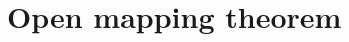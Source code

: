 \newpage
\section{Open mapping theorem}
\begin{comment}
\bsegin{comment}
\begin{definition}[Open map]\label{open map}\nl
	An open map is one for which the image of every open set is open.
\end{definition}
\begin{theorem}[Open Mapping Theorem]\label{OMT}\nl
	Let $X,Y$ be Banach spaces, $T:X\xrightarrow{}Y$ a continuous surjective linear map. Then $T$ is an open map.
\end{theorem}
\eend{comment}

\begin{definition}[Open Ball]\nl
	An open ball in normed linear space $X$ with radius $r>0$ centered at $x\in X$ is
	$$
		B_X(x,r)=\{y\in X:\norm{y-x}_X<r\}
	$$
	Also, when $x=0$ we write
	$$
		B_X(0,r)\equiv B_x(r)
	$$
\end{definition}

\begin{definition}[Open map]\label{open map}\nl
	Let $X$, $Y$ be linear spaces. \func{A}{X}{Y} is {\underline{open}} if $A(U)\subset Y $ is open.
\end{definition}

\begin{remark}\hfill

	\begin{itemize}
		\item $A$ being continuous means $A^{-1}(V)\subset{X}$ open $\forall V\subset Y$ open.
		\item $A$ being continuous need not be open. e.g. $Ax\stackrel{def}{=}0\in Y$
	\end{itemize}
\end{remark}

\begin{theorem}[Open Mapping Theorem]\label{OMT}\nl
	Let $X,Y$ be Banach, $A\subset\mathcal{L}(X,Y)$. Then:
	\begin{itemize}
		\item[i)] if $A$ is surjective, $A$ is open.
		\item[ii)] if $A$ is bijective, then $A^{-1}\in \mathcal{L}(X,Y)$. (Inverse operator theorem)
	\end{itemize}
\end{theorem}

\begin{remark}\nl
	ii) important in application. If $A\in\mathcal{L}(X,Y)$ is bijective then \func{A^{-1}}{X}{Y} liner is easy (why?). The point is $A^{-1}$ is also bounded, or equivalently continuous.
\end{remark}


\end{comment}
